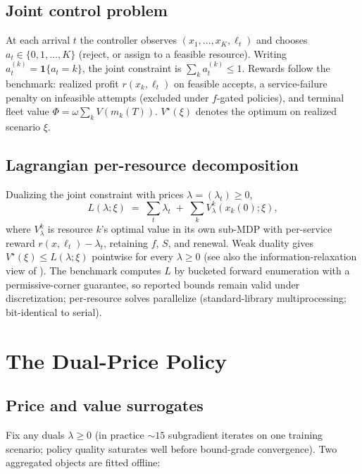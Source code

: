 \documentclass[11pt]{article}
\newcommand{\Vstar}{V^{\star}}
\begin{document}
\subsection{Joint control problem}

At each arrival $t$ the controller observes $(x_1, \dots, x_K, \ell_t)$
and chooses $a_t \in \{0, 1, \dots, K\}$ (reject, or assign to a
feasible resource). Writing $a^{(k)}_t = \mathbf{1}\{a_t = k\}$, the
joint constraint is $\sum_k a^{(k)}_t \leq 1$. Rewards follow the
benchmark: realized profit $r(x_k, \ell_t)$ on feasible accepts, a
service-failure penalty on infeasible attempts (excluded under
$f$-gated policies), and terminal fleet value
$\Phi = \omega \sum_k V(m_k(T))$. $\Vstar(\xi)$ denotes the optimum on
realized scenario $\xi$.

\subsection{Lagrangian per-resource decomposition}
\label{sec:lagrangian}

Dualizing the joint constraint with prices
$\lambda = (\lambda_t) \geq 0$,
\begin{equation}
  L(\lambda; \xi) \;=\; \sum_t \lambda_t
  \;+\; \sum_k V^k_{\lambda}(x_k(0); \xi),
  \label{eq:lag}
\end{equation}
where $V^k_{\lambda}$ is resource $k$'s optimal value in its own sub-MDP
with per-service reward $r(x, \ell_t) - \lambda_t$, retaining $f$, $S$,
and renewal. Weak duality gives $\Vstar(\xi) \leq L(\lambda; \xi)$
pointwise for every $\lambda \geq 0$ (see also the
information-relaxation view of \citealp{brown2010information}). The benchmark computes $L$ by
bucketed forward enumeration with a permissive-corner guarantee, so
reported bounds remain valid under discretization; per-resource solves
parallelize (standard-library multiprocessing; bit-identical to serial).

\section{The Dual-Price Policy}
\label{sec:policy}

\subsection{Price and value surrogates}
\label{sec:surrogates}

Fix any duals $\lambda \geq 0$ (in practice ${\sim}15$ subgradient
iterates on one training scenario; policy quality saturates well before
bound-grade convergence). Two aggregated objects are fitted offline:
\end{document}
